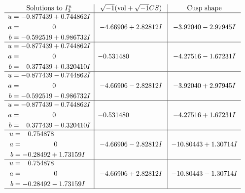 \documentclass[1p]{elsarticle_modified}
\theoremstyle{definition}
\newcommand{\I}{\sqrt{-1}}
\begin{document}
$$\begin{array}{c|c|c}  
\text{Solutions to }I^u_{3}& \I (\text{vol} + \sqrt{-1}CS) & \text{Cusp shape}\\
 \hline 
\begin{aligned}
u &= -0.877439 + 0.744862 I \\
a &= \phantom{-0.000000 } 0 \\
b &= -0.592519 + 0.986732 I\end{aligned}
 & -4.66906 + 2.82812 I & -3.92040 - 2.97945 I \\ \hline\begin{aligned}
u &= -0.877439 + 0.744862 I \\
a &= \phantom{-0.000000 } 0 \\
b &= \phantom{-}0.377439 + 0.320410 I\end{aligned}
 & -0.531480\phantom{ +0.000000I} & -4.27516 - 1.67231 I \\ \hline\begin{aligned}
u &= -0.877439 - 0.744862 I \\
a &= \phantom{-0.000000 } 0 \\
b &= -0.592519 - 0.986732 I\end{aligned}
 & -4.66906 - 2.82812 I & -3.92040 + 2.97945 I \\ \hline\begin{aligned}
u &= -0.877439 - 0.744862 I \\
a &= \phantom{-0.000000 } 0 \\
b &= \phantom{-}0.377439 - 0.320410 I\end{aligned}
 & -0.531480\phantom{ +0.000000I} & -4.27516 + 1.67231 I \\ \hline\begin{aligned}
u &= \phantom{-}0.754878\phantom{ +0.000000I} \\
a &= \phantom{-0.000000 } 0 \\
b &= -0.28492 + 1.73159 I\end{aligned}
 & -4.66906 - 2.82812 I & -10.80443 + 1.30714 I \\ \hline\begin{aligned}
u &= \phantom{-}0.754878\phantom{ +0.000000I} \\
a &= \phantom{-0.000000 } 0 \\
b &= -0.28492 - 1.73159 I\end{aligned}
 & -4.66906 + 2.82812 I & -10.80443 - 1.30714 I\\
 \hline 
 \end{array}$$\newpage
\newpage\renewcommand{\arraystretch}{1}
\end{document}
